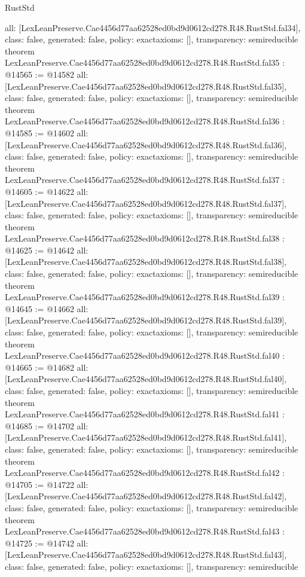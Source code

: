 \begin{lexlean}{RustStd}
\begin{coremodule}
{  all: [LexLeanPreserve.Cae4456d77aa62528ed0bd9d0612cd278.R48.RustStd.fal34],
  class: false,
  generated: false,
  policy: exact{axioms: []},
  transparency: semireducible
}
theorem LexLeanPreserve.Cae4456d77aa62528ed0bd9d0612cd278.R48.RustStd.fal35 : @14565 := @14582 {
  all: [LexLeanPreserve.Cae4456d77aa62528ed0bd9d0612cd278.R48.RustStd.fal35],
  class: false,
  generated: false,
  policy: exact{axioms: []},
  transparency: semireducible
}
theorem LexLeanPreserve.Cae4456d77aa62528ed0bd9d0612cd278.R48.RustStd.fal36 : @14585 := @14602 {
  all: [LexLeanPreserve.Cae4456d77aa62528ed0bd9d0612cd278.R48.RustStd.fal36],
  class: false,
  generated: false,
  policy: exact{axioms: []},
  transparency: semireducible
}
theorem LexLeanPreserve.Cae4456d77aa62528ed0bd9d0612cd278.R48.RustStd.fal37 : @14605 := @14622 {
  all: [LexLeanPreserve.Cae4456d77aa62528ed0bd9d0612cd278.R48.RustStd.fal37],
  class: false,
  generated: false,
  policy: exact{axioms: []},
  transparency: semireducible
}
theorem LexLeanPreserve.Cae4456d77aa62528ed0bd9d0612cd278.R48.RustStd.fal38 : @14625 := @14642 {
  all: [LexLeanPreserve.Cae4456d77aa62528ed0bd9d0612cd278.R48.RustStd.fal38],
  class: false,
  generated: false,
  policy: exact{axioms: []},
  transparency: semireducible
}
theorem LexLeanPreserve.Cae4456d77aa62528ed0bd9d0612cd278.R48.RustStd.fal39 : @14645 := @14662 {
  all: [LexLeanPreserve.Cae4456d77aa62528ed0bd9d0612cd278.R48.RustStd.fal39],
  class: false,
  generated: false,
  policy: exact{axioms: []},
  transparency: semireducible
}
theorem LexLeanPreserve.Cae4456d77aa62528ed0bd9d0612cd278.R48.RustStd.fal40 : @14665 := @14682 {
  all: [LexLeanPreserve.Cae4456d77aa62528ed0bd9d0612cd278.R48.RustStd.fal40],
  class: false,
  generated: false,
  policy: exact{axioms: []},
  transparency: semireducible
}
theorem LexLeanPreserve.Cae4456d77aa62528ed0bd9d0612cd278.R48.RustStd.fal41 : @14685 := @14702 {
  all: [LexLeanPreserve.Cae4456d77aa62528ed0bd9d0612cd278.R48.RustStd.fal41],
  class: false,
  generated: false,
  policy: exact{axioms: []},
  transparency: semireducible
}
theorem LexLeanPreserve.Cae4456d77aa62528ed0bd9d0612cd278.R48.RustStd.fal42 : @14705 := @14722 {
  all: [LexLeanPreserve.Cae4456d77aa62528ed0bd9d0612cd278.R48.RustStd.fal42],
  class: false,
  generated: false,
  policy: exact{axioms: []},
  transparency: semireducible
}
theorem LexLeanPreserve.Cae4456d77aa62528ed0bd9d0612cd278.R48.RustStd.fal43 : @14725 := @14742 {
  all: [LexLeanPreserve.Cae4456d77aa62528ed0bd9d0612cd278.R48.RustStd.fal43],
  class: false,
  generated: false,
  policy: exact{axioms: []},
  transparency: semireducible
}
\end{coremodule}
\end{lexlean}
